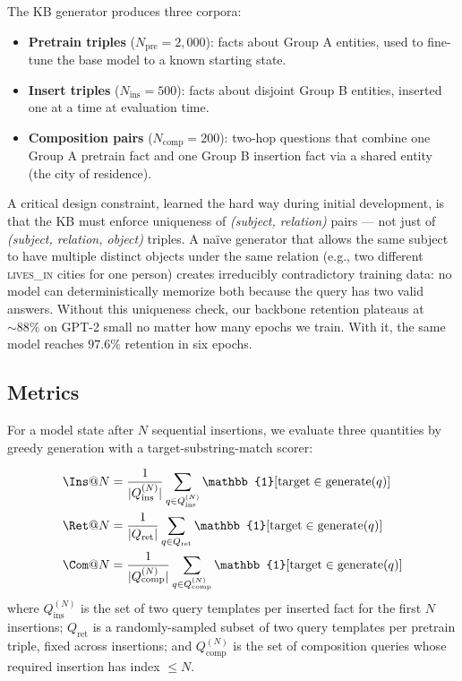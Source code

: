 \documentclass[11pt,a4paper]{article}
\begin{document}
The KB generator produces three corpora:
\begin{itemize}[leftmargin=*,topsep=2pt,itemsep=1pt]
\item \textbf{Pretrain triples} ($N_\text{pre} = 2{,}000$): facts about
Group A entities, used to fine-tune the base model to a known starting
state.
\item \textbf{Insert triples} ($N_\text{ins} = 500$): facts about
disjoint Group B entities, inserted one at a time at evaluation time.
\item \textbf{Composition pairs} ($N_\text{comp} = 200$): two-hop
questions that combine one Group A pretrain fact and one Group B
insertion fact via a shared entity (the city of residence).
\end{itemize}
A critical design constraint, learned the hard way during initial
development, is that the KB must enforce uniqueness of
\emph{(subject, relation)} pairs --- not just of \emph{(subject,
relation, object)} triples. A na\"ive generator that allows the same
subject to have multiple distinct objects under the same relation
(e.g., two different \textsc{lives\_in} cities for one person) creates
irreducibly contradictory training data: no model can deterministically
memorize both because the query has two valid answers. Without this
uniqueness check, our backbone retention plateaus at $\sim 88\%$ on
GPT-2 small no matter how many epochs we train. With it, the same model
reaches $97.6\%$ retention in six epochs.

\subsection{Metrics}

For a model state after $N$ sequential insertions, we evaluate three
quantities by greedy generation with a target-substring-match scorer:

\begin{align}
\Ins@N &= \frac{1}{|Q_\text{ins}^{(N)}|} \sum_{q \in Q_\text{ins}^{(N)}} \mathbb{1}[\text{target} \in \text{generate}(q)] \\
\Ret@N &= \frac{1}{|Q_\text{ret}|} \sum_{q \in Q_\text{ret}} \mathbb{1}[\text{target} \in \text{generate}(q)] \\
\Com@N &= \frac{1}{|Q_\text{comp}^{(N)}|} \sum_{q \in Q_\text{comp}^{(N)}} \mathbb{1}[\text{target} \in \text{generate}(q)]
\end{align}
where $Q_\text{ins}^{(N)}$ is the set of two query templates per
inserted fact for the first $N$ insertions; $Q_\text{ret}$ is a
randomly-sampled subset of two query templates per pretrain triple,
fixed across insertions; and $Q_\text{comp}^{(N)}$ is the set of
composition queries whose required insertion has index $\le N$.
\end{document}
